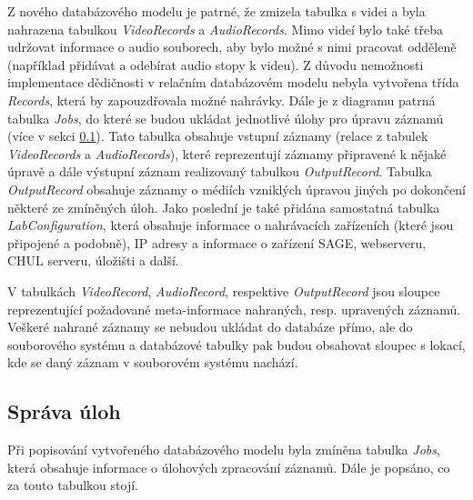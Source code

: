 \documentclass[thesis=M,czech]{FITthesis}[2012/06/26]
\begin{document}
Z nového databázového modelu je patrné, že zmizela tabulka s videi a byla nahrazena tabulkou \textit{VideoRecords} a \textit{AudioRecords}. Mimo videí bylo také třeba udržovat informace o audio souborech, aby bylo možné s nimi pracovat odděleně (například přidávat a odebírat audio stopy k videu). Z důvodu nemožnosti implementace dědičnosti v relačním databázovém modelu nebyla vytvořena třída \textit{Records}, která by zapouzdřovala možné nahrávky. Dále je z diagramu patrná tabulka \textit{Jobs},  do které se budou ukládat jednotlivé úlohy pro úpravu záznamů (více v sekci \ref{subsec:navrh_backend_ulohy}). Tato tabulka obsahuje vstupní záznamy (relace z tabulek \textit{VideoRecords} a \textit{AudioRecords}), které reprezentují záznamy připravené k nějaké úpravě a dále výstupní záznam realizovaný tabulkou \textit{OutputRecord}. Tabulka \textit{OutputRecord} obsahuje záznamy o médiích vzniklých úpravou jiných po dokončení některé ze zmíněných úloh. Jako poslední je také přidána samostatná tabulka \textit{LabConfiguration}, která obsahuje informace o nahrávacích zařízeních (které jsou připojené a podobně), IP adresy a informace o zařízení SAGE, webserveru, CHUL serveru, úložišti a další.

V tabulkách \textit{VideoRecord}, \textit{AudioRecord}, respektive \textit{OutputRecord} jsou sloupce reprezentující požadované meta-informace nahraných, resp. upravených záznamů. Veškeré nahrané záznamy se nebudou ukládat do databáze přímo, ale do souborového systému a databázové tabulky pak budou obsahovat sloupec s lokací, kde se daný záznam v souborovém systému nachází.


\subsection{Správa úloh} \label{subsec:navrh_backend_ulohy}
Při popisování vytvořeného databázového modelu byla zmíněna tabulka \textit{Jobs}, která obsahuje informace o úlohových zpracování záznamů. Dále je popsáno, co za touto tabulkou stojí.
\end{document}
